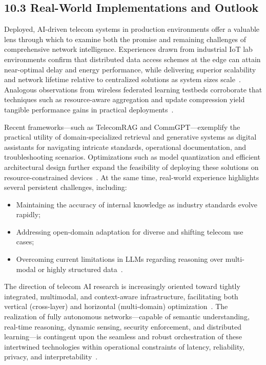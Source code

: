 \documentclass[11pt]{article}
\begin{document}
\subsection{10.3 Real-World Implementations and Outlook}

Deployed, AI-driven telecom systems in production environments offer a valuable lens through which to examine both the promise and remaining challenges of comprehensive network intelligence. Experiences drawn from industrial IoT lab environments confirm that distributed data access schemes at the edge can attain near-optimal delay and energy performance, while delivering superior scalability and network lifetime relative to centralized solutions as system sizes scale~\cite{ref14}. Analogous observations from wireless federated learning testbeds corroborate that techniques such as resource-aware aggregation and update compression yield tangible performance gains in practical deployments~\cite{ref12}.

Recent frameworks—such as TelecomRAG and CommGPT—exemplify the practical utility of domain-specialized retrieval and generative systems as digital assistants for navigating intricate standards, operational documentation, and troubleshooting scenarios. Optimizations such as model quantization and efficient architectural design further expand the feasibility of deploying these solutions on resource-constrained devices~\cite{ref11,ref22,ref29}. At the same time, real-world experience highlights several persistent challenges, including:
\begin{itemize}
  \item Maintaining the accuracy of internal knowledge as industry standards evolve rapidly;
  \item Addressing open-domain adaptation for diverse and shifting telecom use cases;
  \item Overcoming current limitations in LLMs regarding reasoning over multi-modal or highly structured data~\cite{ref21,ref29}.
\end{itemize}

The direction of telecom AI research is increasingly oriented toward tightly integrated, multimodal, and context-aware infrastructure, facilitating both vertical (cross-layer) and horizontal (multi-domain) optimization~\cite{ref24,ref25}. The realization of fully autonomous networks—capable of semantic understanding, real-time reasoning, dynamic sensing, security enforcement, and distributed learning—is contingent upon the seamless and robust orchestration of these intertwined technologies within operational constraints of latency, reliability, privacy, and interpretability~\cite{ref14,ref19,ref20,ref24,ref26}.
\end{document}
